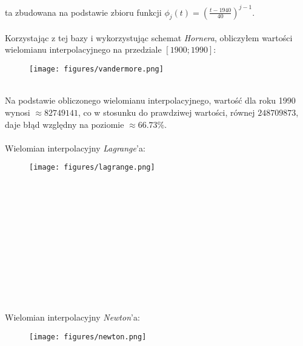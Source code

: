 \documentclass{article}
\begin{document}
ta zbudowana na podstawie zbioru funkcji $\phi_j(t) = \left(\frac{t-1940}{40}\right)^{j-1}$.
\\\\
Korzystając z tej bazy i wykorzystując schemat \textit{Hornera}, 
obliczyłem wartości wielomianu interpolacyjnego na przedziale $[1900; 1990]$:
\begin{figure}[ht!]
  \texttt{[image: figures/vandermore.png]}
\end{figure}
\\
Na podstawie obliczonego wielomianu interpolacyjnego, wartość dla roku
1990 wynosi $\approx 82 749 141$, co w stosunku do prawdziwej wartości,
równej $248 709 873$, daje błąd względny na poziomie $\approx 66.73\%$.
\\\\
Wielomian interpolacyjny \textit{Lagrange}'a:
\begin{figure}[ht!]
  \texttt{[image: figures/lagrange.png]}
\end{figure}
\\\\\\\\\\\\\\\\\\\\\\
Wielomian interpolacyjny \textit{Newton}'a:
\begin{figure}[ht!]
  \texttt{[image: figures/newton.png]}
\end{figure}
\\\\\\\\\\\\\\\\\\\\\\\\\\\\\\\\\\\\\\\\\\
\end{document}
